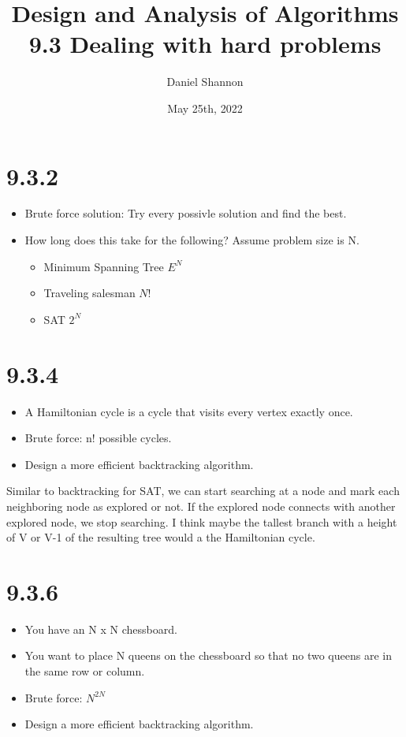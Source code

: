 \documentclass[12pt, letterpaper, twoside]{article}
\title{%
Design and Analysis of Algorithms\\
\large 9.3 Dealing with hard problems
}
\author{Daniel Shannon}
\date{May 25th, 2022}
\begin{document}
\begin{titlepage}
\maketitle
\end{titlepage}

\section*{9.3.2}
\begin{itemize}
    \item Brute force solution: Try every possivle solution and find the best.
    \item How long does this take for the following? Assume problem size is N.
    \begin{itemize}
        \item Minimum Spanning Tree
        $E^N$
        \item Traveling salesman
        $N!$
        \item SAT
        $2^N$
    \end{itemize}
\end{itemize}

\section*{9.3.4}
\begin{itemize}
    \item A Hamiltonian cycle is a cycle that visits every vertex exactly once.
    \item Brute force: n! possible cycles.
    \item Design a more efficient backtracking algorithm.
\end{itemize}

Similar to backtracking for SAT, we can start searching at a node and mark each neighboring node
as explored or not. If the explored node connects with another explored node, we stop searching.
I think maybe the tallest branch with a height of V or V-1 of the resulting tree would a the Hamiltonian cycle.

\section*{9.3.6}
\begin{itemize}
    \item You have an N x N chessboard.
    \item You want to place N queens on the chessboard so that no two queens are in the same row or column.
    \item Brute force: $N^{2N}$
    \item Design a more efficient backtracking algorithm.
\end{itemize}
\end{document}
